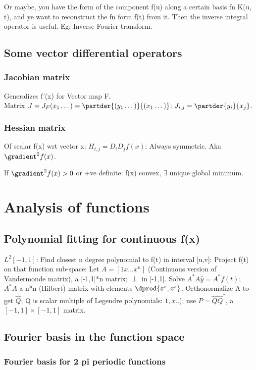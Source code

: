 \documentclass[oneside, article]{memoir}
\begin{document}
Or maybe, you have the form of the component f(u) along a certain basis fn K(u, t), and ye want to reconstruct the fn form f(t) from it. Then the inverse integral operator is useful. Eg: Inverse Fourier transform.

\section{Some vector differential operators}
\subsection{Jacobian matrix}
Generalizes f'(x) for Vector map F. \\
Matrix $J = J_{F}(x_{1} \dots) = \partder{(y_{1} \dots)}{(x_{1} \dots)}$: $J_{i,j} = \partder{y_{i}}{x_{j}}$.

\subsection{Hessian matrix}
Of scalar f(x) wrt vector x: $H_{i,j} = D_{i}D_{j}f(x)$: Always symmetric. Aka $\gradient^{2} f(x)$.

If $\gradient^{2} f(x) > 0$ or +ve definite: f(x) convex, $\exists$ unique global minimum.

\chapter{Analysis of functions}
\section{Polynomial fitting for continuous f(x)}
$L^{2}[-1,1]$: Find closest n degree polynomial to f(t) in interval [u,v]: Project f(t) on that function sub-space: Let $A=[1 x \dots x^{n}]$ (Continuous version of Vandermonde matrix), a [-1,1]*n matrix; $\perp$ in [-1,1]. Solve $A^{*}A\hat{y}=A^{*}f(t)$; $A^{*}A$ a n*n (Hilbert) matrix with elements $\dprod{x^{r}, x^{s}}$. Orthonormalize A to get $\hat{Q}$; Q is scalar multiple of Legendre polynomials: $1, x .. $); use $P = \hat{Q}\hat{Q}^{*}$, a $[-1, 1] \times [-1,1]$ matrix.

\section{Fourier basis in the function space}
\subsection{Fourier basis for 2 pi periodic functions}
\end{document}
